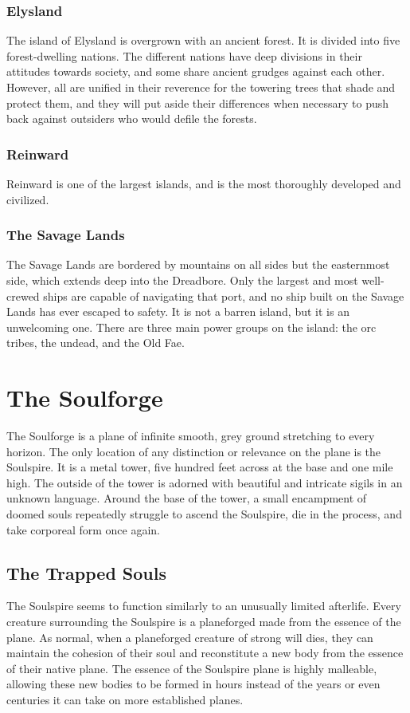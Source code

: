     \subsubsection{Elysland}
      The island of Elysland is overgrown with an ancient forest.
      It is divided into five forest-dwelling nations.
      The different nations have deep divisions in their attitudes towards society, and some share ancient grudges against each other.
      However, all are unified in their reverence for the towering trees that shade and protect them, and they will put aside their differences when necessary to push back against outsiders who would defile the forests.

    \subsubsection{Reinward}
      Reinward is one of the largest islands, and is the most thoroughly developed and civilized.

    \subsubsection{The Savage Lands}
      The Savage Lands are bordered by mountains on all sides but the easternmost side, which extends deep into the Dreadbore.
      Only the largest and most well-crewed ships are capable of navigating that port, and no ship built on the Savage Lands has ever escaped to safety.
      It is not a barren island, but it is an unwelcoming one.
      There are three main power groups on the island: the orc tribes, the undead, and the Old Fae.

\section{The Soulforge}
  The Soulforge is a plane of infinite smooth, grey ground stretching to every horizon.
  The only location of any distinction or relevance on the plane is the Soulspire.
  It is a metal tower, five hundred feet across at the base and one mile high.
  The outside of the tower is adorned with beautiful and intricate sigils in an unknown language.
  Around the base of the tower, a small encampment of doomed souls repeatedly struggle to ascend the Soulspire, die in the process, and take corporeal form once again.

  \subsection{The Trapped Souls}
    The Soulspire seems to function similarly to an unusually limited afterlife.
    Every creature surrounding the Soulspire is a planeforged made from the essence of the plane.
    As normal, when a planeforged creature of strong will dies, they can maintain the cohesion of their soul and reconstitute a new body from the essence of their native plane.
    The essence of the Soulspire plane is highly malleable, allowing these new bodies to be formed in hours instead of the years or even centuries it can take on more established planes.

